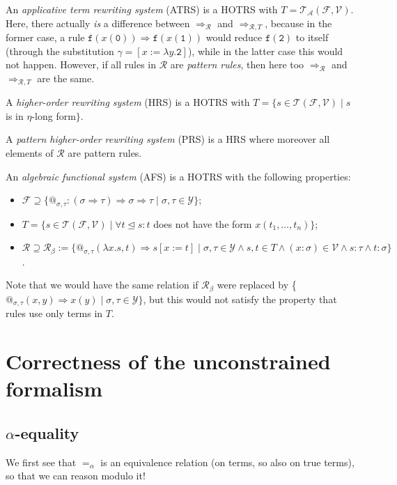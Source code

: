 \documentclass{lmcs}
\theoremstyle{theorem}\newtheorem{theorem}{Theorem}
\theoremstyle{theorem}\newtheorem{lemma}[theorem]{Lemma}
\theoremstyle{theorem}\newtheorem{corollary}[theorem]{Corollary}
\theoremstyle{definition}\newtheorem{definition}[theorem]{Definition}
\theoremstyle{definition}\newtheorem{example}[theorem]{Example}
\newcommand{\F}{\mathcal{F}}
\newcommand{\V}{\mathcal{V}}
\newcommand{\Types}{\mathcal{Y}}
\newcommand{\Terms}{\mathcal{T}}
\newcommand{\ATerms}{\mathcal{T}_{\mathcal{A}}}
\newcommand{\Rules}{\mathcal{R}}
\newcommand{\identifier}[1]{\mathtt{#1}}
\newcommand{\afun}{\identifier{f}}
\newcommand{\avar}{x}
\newcommand{\bvar}{y}
\newcommand{\abs}[2]{\lambda #1.#2}
\newcommand{\arrtype}{\Rightarrow}
\newcommand{\arrz}{\Rightarrow}
\newcommand{\arr}[1]{\arrz_{#1}}
\newcommand{\subtermeq}{\unlhd}
\newcommand{\symb}[1]{\mathtt{#1}}
\newcommand{\nul}{\symb{0}}
\begin{document}
An \emph{applicative term rewriting system} (ATRS) is a HOTRS with $T = \ATerms(\F,\V)$.  Here,
there actually \emph{is} a difference between $\arr{\Rules}$ and $\arr{\Rules,T}$, because in the
former case, a rule $\afun(\avar(\nul)) \arrz \afun(\avar(\symb{1}))$ would reduce
$\afun(\symb{2})$ to itself (through the substitution $\gamma = [\avar:=\abs{\bvar}{\symb{2}}]$),
while in the latter case this would not happen.  However, if all rules in $\Rules$ are
\emph{pattern rules}, then here too $\arr{\Rules}$ and $\arr{\Rules,T}$ are the same.

A \emph{higher-order rewriting system} (HRS) is a HOTRS with $T = \{ s \in \Terms(\F,\V) \mid s$
is in $\eta$-long form$\}$.

A \emph{pattern higher-order rewriting system} (PRS) is a HRS where moreover all elements of
$\Rules$ are pattern rules.

An \emph{algebraic functional system} (AFS) is a HOTRS with the following properties:
\begin{itemize}
\item $\F \supseteq \{ @_{\sigma,\tau} : (\sigma \arrtype \tau) \arrtype \sigma \arrtype \tau
  \mid \sigma,\tau \in \Types \}$;
\item $T = \{ s \in \Terms(\F,\V) \mid \forall t \subtermeq s: t$ does not have the form
  $\avar(t_1,\dots,t_n)\}$;
\item $\Rules \supseteq \Rules_\beta := \{ @_{\sigma,\tau}(\abs{\avar}{s},t) \arrz s[\avar:=t] \mid
  \sigma,\tau \in \Types \wedge s,t \in T \wedge (\avar : \sigma) \in \V \wedge s : \tau \wedge
  t : \sigma \}$.
\end{itemize}
Note that we would have the same relation if $\Rules_\beta$ were replaced by \{
$@_{\sigma,\tau}(\avar,\bvar) \arrz \avar(\bvar) \mid \sigma,\tau \in \Types \}$, but this would not
satisfy the property that rules use only terms in $T$.

\newpage\appendix

\section{Correctness of the unconstrained formalism}

\subsection{$\alpha$-equality}

We first see that $=_\alpha$ is an equivalence relation (on terms, so also on true terms), so that
we can reason modulo it!
\end{document}
